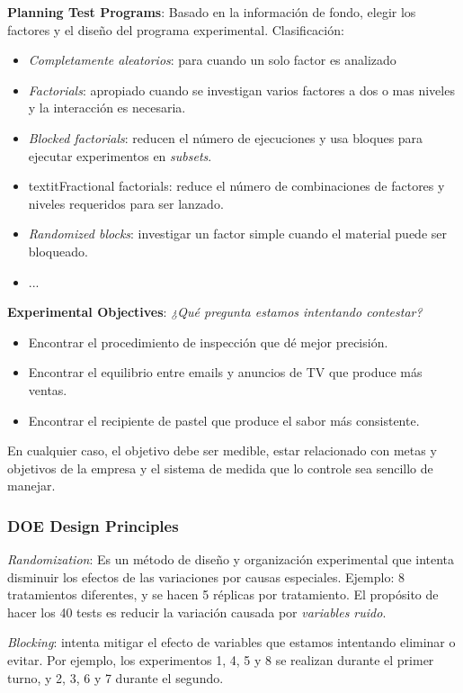\documentclass[]{article}
\begin{document}
\textbf{Planning Test Programs}: Basado en la información de fondo, elegir los factores y el diseño del programa experimental. Clasificación:
\begin{itemize}
	\item \textit{Completamente aleatorios}: para cuando un solo factor es analizado
	\item \textit{Factorials}: apropiado cuando se investigan varios factores a dos o mas niveles y la interacción es necesaria.
	\item \textit{Blocked factorials}: reducen el número de ejecuciones y usa bloques para ejecutar experimentos en \textit{subsets}.
	\item textit{Fractional factorials}: reduce el número de combinaciones de factores y niveles requeridos para ser lanzado.
	\item \textit{Randomized blocks}: investigar un factor simple cuando el material puede ser bloqueado.
	\item ...
\end{itemize}
 
\textbf{Experimental Objectives}: \textit{¿Qué pregunta estamos intentando contestar?} 
\begin{itemize}
	\item Encontrar el procedimiento de inspección que dé mejor precisión.
	\item Encontrar el equilibrio entre emails y anuncios de TV que produce más ventas.
	\item Encontrar el recipiente de pastel que produce el sabor más consistente.
\end{itemize}
En cualquier caso, el objetivo debe ser medible, estar relacionado con metas y objetivos de la empresa y el sistema de medida que lo controle sea sencillo de manejar.

\subsubsection{DOE Design Principles}

\textit{Randomization}: Es un método de diseño y organización experimental que intenta disminuir los efectos de las variaciones por causas especiales. Ejemplo: 8 tratamientos diferentes, y se hacen 5 réplicas por tratamiento. El propósito de hacer los 40 tests es reducir la variación causada por \textit{variables ruido}.

\textit{Blocking}: intenta mitigar el efecto de variables que estamos intentando eliminar o evitar. Por ejemplo, los experimentos 1, 4, 5 y 8 se realizan durante el primer turno, y 2, 3, 6 y 7 durante el segundo.
\end{document}
